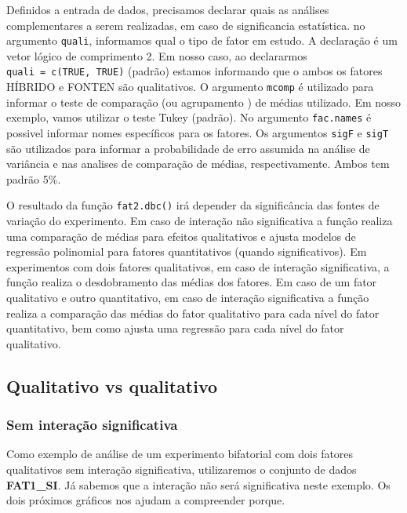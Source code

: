 \documentclass[
]{book}
\numberwithin{equation}{section}
\newcommand{\indt}[1]{\index{#1|ST}}
\begin{document}
Definidos a entrada de dados, precisamos declarar quais as análises complementares a serem realizadas, em caso de significancia estatística. no argumento \texttt{quali}, informamos qual o tipo de fator em estudo. A declaração é um vetor lógico de comprimento 2. Em nosso caso, ao declararmos \texttt{quali\ =\ c(TRUE,\ TRUE)} (padrão) estamos informando que o ambos os fatores HÍBRIDO e FONTEN são qualitativos. O argumento \texttt{mcomp} é utilizado para informar o teste de comparação (ou agrupamento \indt{agrupamento}) de médias utilizado. Em nosso exemplo, vamos utilizar o teste Tukey (padrão). No argumento \texttt{fac.names} é possivel informar nomes específicos para os fatores. Os argumentos \texttt{sigF} e \texttt{sigT} são utilizados para informar a probabilidade de erro assumida na análise de variância e nas analises de comparação de médias, respectivamente. Ambos tem padrão 5\%.

O resultado da função \texttt{fat2.dbc()} irá depender da significância das fontes de variação do experimento. Em caso de interação não significativa \indt{interação} a função realiza uma comparação de médias para efeitos qualitativos e ajusta modelos de regressão polinomial para fatores quantitativos (quando significativos). Em experimentos com dois fatores qualitativos, em caso de interação significativa, a função realiza o desdobramento das médias dos fatores. Em caso de um fator qualitativo e outro quantitativo, em caso de interação significativa a função realiza a comparação das médias do fator qualitativo para cada nível do fator quantitativo, bem como ajusta uma regressão para cada nível do fator qualitativo.

\hypertarget{qualitativo-vs-qualitativo}{%
\subsection{Qualitativo vs qualitativo}\label{qualitativo-vs-qualitativo}}

\hypertarget{sem-interauxe7uxe3o-significativa}{%
\subsubsection{Sem interação significativa}\label{sem-interauxe7uxe3o-significativa}}

Como exemplo de análise de um experimento bifatorial com dois fatores qualitativos sem interação \indt{interação} significativa, utilizaremos o conjunto de dados \textbf{FAT1\_SI}. Já sabemos que a interação não será significativa neste exemplo. Os dois próximos gráficos nos ajudam a compreender porque.
\end{document}
